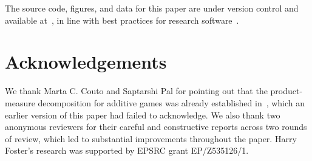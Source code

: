 \documentclass[11pt]{article}
\begin{document}
The source code, figures, and data for this paper are under version control
and available at~\cite{foster2026repo}, in line with best practices for
research software~\cite{wilson2017good}.

\section{Acknowledgements}
We thank Marta C. Couto and Saptarshi Pal for pointing out that the product-measure
decomposition for additive games was already established in~\cite{couto2023multiplayer},
which an earlier version of this paper had failed to acknowledge. We also
thank two anonymous reviewers for their careful and constructive reports
across two rounds of review, which led to substantial improvements
throughout the paper.
Harry Foster's research was supported by EPSRC grant EP/Z535126/1.



\end{document}
